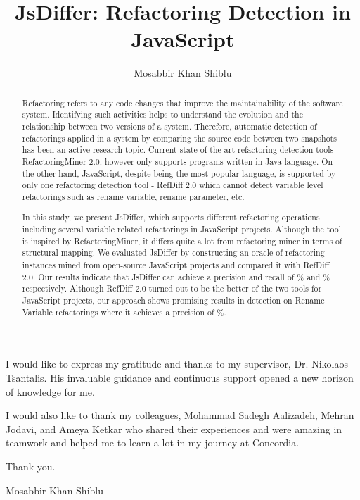 \documentclass[letterpaper,12pt,onecolumn,final]{report}
\author{Mosabbir Khan Shiblu}
\title{JsDiffer: Refactoring Detection in JavaScript}
\begin{document}
\begin{abstract}
{%

Refactoring refers to any code changes that improve the maintainability of the software system. Identifying such activities helps to understand the evolution and the relationship between two versions of a system. Therefore, automatic detection of refactorings applied in a system by comparing the source code between two snapshots has been an active research topic. Current state-of-the-art refactoring detection tools RefactoringMiner 2.0, however only supports programs written in Java language. On the other hand, JavaScript, despite being the most popular language, is supported by only one refactoring detection tool - RefDiff 2.0 which cannot detect variable level refactorings such as rename variable, rename parameter, etc. 

In this study, we present JsDiffer, which supports \textbf{\supportedRefTypesJsDiffer{}} different refactoring operations including several variable related refactorings in JavaScript projects. Although the tool is inspired by RefactoringMiner, it differs quite a lot from refactoring miner in terms of structural mapping. We evaluated JsDiffer by constructing an oracle of \textbf{\oracleValidatedInstances{}} refactoring instances mined from \oracleProjectCount{} open-source JavaScript projects and compared it with RefDiff 2.0. Our results indicate that JsDiffer can achieve a precision and recall of \rmOverallPrecision{}\% and \rmOverallRecall{}\% respectively. Although  RefDiff 2.0 turned out to be the better of the two tools for JavaScript projects, our approach shows promising results in detection on Rename Variable refactorings where it achieves a precision of \renameVarPrecision{}\%.

}\end{abstract}


\begin{acknowledgments}

I would like to express my gratitude and thanks to my supervisor, Dr. Nikolaos Tsantalis. His invaluable guidance and continuous support opened a new horizon of knowledge for me.

I would also like to thank my colleagues, Mohammad Sadegh Aalizadeh, Mehran Jodavi, and Ameya Ketkar who shared their experiences and were amazing in teamwork and helped me to learn a lot in my journey at Concordia.

\vspace{5mm}

Thank you.

Mosabbir Khan Shiblu
	
\end{acknowledgments}
\end{document}
